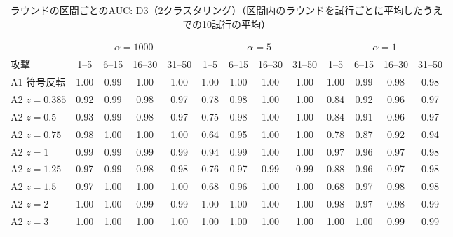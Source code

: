 \documentclass[a4j, twocolumn, dvipdfmx]{jsarticle}
\begin{document}
\begin{table}[H]
\centering
\caption{ラウンドの区間ごとのAUC: D3（2クラスタリング）（区間内のラウンドを試行ごとに平均したうえでの10試行の平均）}
\label{tab:seg-d3}
\footnotesize
\tabcolsep=3.2pt
\begin{tabular}{@{}l@{\hspace{5pt}}cccc@{\hspace{8pt}}cccc@{\hspace{8pt}}cccc@{}}
\toprule
 & \multicolumn{4}{c}{$\alpha=1000$} & \multicolumn{4}{c}{$\alpha=5$} & \multicolumn{4}{c}{$\alpha=1$} \\
\cmidrule(lr){2-5}\cmidrule(lr){6-9}\cmidrule(l){10-13}
攻撃 & 1--5 & 6--15 & 16--30 & 31--50 & 1--5 & 6--15 & 16--30 & 31--50 & 1--5 & 6--15 & 16--30 & 31--50 \\
\midrule
A1 符号反転 & 1.00 & 0.99 & 1.00 & 1.00 & 1.00 & 1.00 & 1.00 & 1.00 & 1.00 & 0.99 & 0.98 & 0.98 \\
\midrule
A2 $z{=}0.385$ & 0.92 & 0.99 & 0.98 & 0.97 & 0.78 & 0.98 & 1.00 & 1.00 & 0.84 & 0.92 & 0.96 & 0.97 \\
A2 $z{=}0.5$ & 0.93 & 0.99 & 0.98 & 0.97 & 0.75 & 0.98 & 1.00 & 1.00 & 0.84 & 0.91 & 0.96 & 0.97 \\
A2 $z{=}0.75$ & 0.98 & 1.00 & 1.00 & 1.00 & 0.64 & 0.95 & 1.00 & 1.00 & 0.78 & 0.87 & 0.92 & 0.94 \\
A2 $z{=}1$ & 0.99 & 0.99 & 0.99 & 0.99 & 0.94 & 0.99 & 1.00 & 1.00 & 0.97 & 0.96 & 0.97 & 0.98 \\
A2 $z{=}1.25$ & 0.97 & 0.99 & 0.98 & 0.98 & 0.76 & 0.97 & 0.99 & 0.99 & 0.88 & 0.96 & 0.97 & 0.98 \\
A2 $z{=}1.5$ & 0.97 & 1.00 & 1.00 & 1.00 & 0.68 & 0.96 & 1.00 & 1.00 & 0.68 & 0.97 & 0.98 & 0.98 \\
A2 $z{=}2$ & 1.00 & 1.00 & 0.99 & 0.99 & 1.00 & 1.00 & 1.00 & 1.00 & 0.98 & 0.97 & 0.98 & 0.99 \\
A2 $z{=}3$ & 1.00 & 1.00 & 1.00 & 1.00 & 1.00 & 1.00 & 1.00 & 1.00 & 1.00 & 1.00 & 0.99 & 0.99 \\
\bottomrule
\end{tabular}
\end{table}
\end{document}
